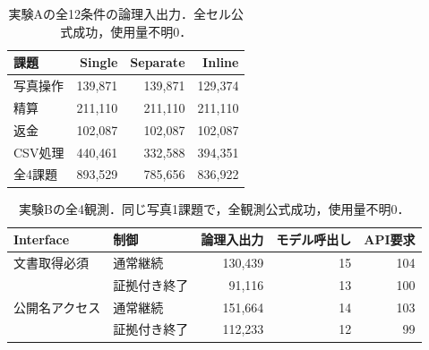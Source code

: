 \begin{table}[t]
\caption{実験Aの全12条件の論理入出力．全セル公式成功，使用量不明0．}
\label{tab:summary}
\centering
\begin{tabular}{lrrr}\hline
課題 & Single & Separate & Inline\\\hline
写真操作 & 139,871 & 139,871 & 129,374\\
精算 & 211,110 & 211,110 & 211,110\\
返金 & 102,087 & 102,087 & 102,087\\
CSV処理 & 440,461 & 332,588 & 394,351\\\hline
全4課題 & 893,529 & 785,656 & 836,922\\\hline
\end{tabular}
\end{table}

\begin{table}[t]
\caption{実験Bの全4観測．同じ写真1課題で，全観測公式成功，使用量不明0．}
\label{tab:termination}
\centering
\begin{tabular}{llrrr}\hline
Interface & 制御 & 論理入出力 & モデル呼出し & API要求\\\hline
文書取得必須 & 通常継続 & 130,439 & 15 & 104\\
 & 証拠付き終了 & 91,116 & 13 & 100\\
公開名アクセス & 通常継続 & 151,664 & 14 & 103\\
 & 証拠付き終了 & 112,233 & 12 & 99\\\hline
\end{tabular}
\end{table}
